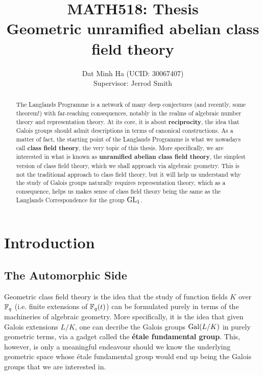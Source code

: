 





	\title{\textbf{MATH518: Thesis
	\\
	Geometric unramified abelian class field theory}}
	
	\author{Dat Minh Ha (UCID: 30067407)\\Supervisor: Jerrod Smith}
	\maketitle
	
	\begin{abstract}
	    The Langlands Programme is a network of many deep conjectures (and recently, some theorem!) with far-reaching consequences, notably in the realms of algebraic number theory and representation theory. At its core, it is about \textbf{reciprocity}, the idea that Galois groups should admit descriptions in terms of canonical constructions. As a matter of fact, the starting point of the Langlands Programme is what we nowadays call \textbf{class field theory}, the very topic of this thesis. More specifically, we are interested in what is known as \textbf{unramified abelian class field theory}, the simplest version of class field theory, which we shall approach via algebraic geometry. This is not the traditional approach to class field theory, but it will help us understand why the study of Galois groups naturally requires representation theory, which as a consequence, helps us makes sense of class field theory being the same as the Langlands Correspondence for the group $\operatorname{GL}_1$.
	\end{abstract}
	
	{
      \hypersetup{} 
      \tableofcontents %
    }
    
    \section{Introduction}
        \subsection{The Automorphic Side}
            Geometric class field theory is the idea that the study of function fields $K$ over $\mathbb{F}_q$ (i.e. finite extensions of $\mathbb{F}_q(t)$) can be formulated purely in terms of the machineries of algebraic geometry. More specifically, it is the idea that given Galois extensions $L/K$, one can decribe the Galois groups $\mathrm{Gal}(L/K)$ in purely geometric terms, via a gadget called the \textbf{\'etale fundamental group}. This, however, is only a meaningful endeavour should we know the underlying geometric space whose \'etale fundamental group would end up being the Galois groups that we are interested in.
            
